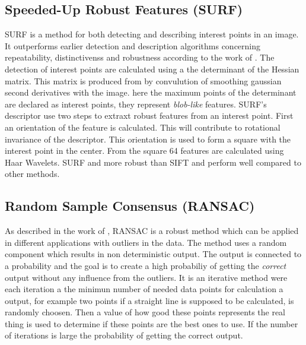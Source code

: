 \subsection{Speeded-Up Robust Features (SURF)}
SURF is a method for both detecting and describing interest points in an image. It outperforms earlier detection and description algorithms concerning repeatability, distinctivenss and robustness according to the work of \cite{SURF}. The detection of interest points are calculated using a the determinant of the Hessian matrix. This matrix is produced from by convulution of smoothing gaussian second derivatives with the image. here the maximum points of the determinant are declared as interest points, they represent {\it blob-like} features. SURF's descriptor use two steps to extraxt robust features from an interest point. First an orientation of the feature is calculated. This will contribute to rotational invariance of the descriptor. This orientation is used to form a square with the interest point in the center. From the square 64 features are calculated using Haar Wavelets. SURF and more robust than SIFT and perform well compared to other methods.

\subsection{Random Sample Consensus (RANSAC)}
As described in the work of \cite{RANSAC}, RANSAC is a robust method which can be applied in different applications with outliers in the data. The method uses a random component which results in non deterministic output. The output is connected to a probability and the goal is to create a high probabiliy of getting the {\it correct} output without any influence from the outliers. It is an iterative method were each iteration a the minimun number of needed data points for calculation a output, for example two points if a straight line is supposed to be calculated, is randomly choosen. Then a value of how good these points represents the real thing is used to determine if these points are the best ones to use. If the number of iterations is large the probability of getting the correct output.
